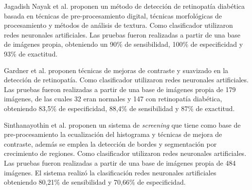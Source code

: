 Jagadish Nayak et al. \cite{nayak2008automated} proponen un método de detección de retinopatía diabética basada en técnicas de pre-procesamiento digital, técnicas morfológicas de procesamiento y métodos de análisis de textura. Como clasificador utilizaron redes neuronales artificiales. Las pruebas fueron realizadas a partir de una base de imágenes propia, obteniendo un 90\% de sensibilidad, 100\% de especificidad y 93\% de exactitud.



Gardner et al. \cite{gardner1996automatic} proponen técnicas de mejoras de contraste y suavizado en la detección de retinopatía. Como clasificador utilizaron redes neuronales artificiales. Las pruebas fueron realizadas a partir de una base de imágenes propia de 179 imágenes, de las cuales 32 eran normales y 147 con retinopatía diabética, obteniendo 83,5\% de especificidad, 88,4\%  de sensibilidad y 87\% de exactitud.

   





Sinthanayothin et al. \cite{sinthanayothin2003automated} proponen un sistema de \textit{screening} que tiene como base de pre-procesamiento la ecualización del histograma y técnicas de mejora de contraste, además se emplea la detección de bordes y segmentación por crecimiento de regiones. Como clasificador utilizaron redes neuronales artificiales.  Las pruebas fueron realizadas a partir de una base de imágenes propia de 484 imágenes. El sistema realizó la clasificación  redes neuronales artificiales obteniendo 80,21\% de sensibilidad y 70,66\% de especificidad.  


